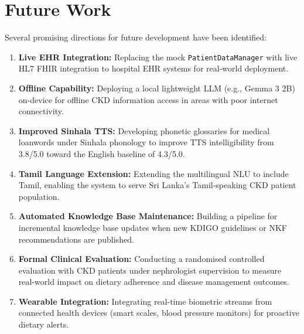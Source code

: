 \documentclass[12pt,a4paper]{report}
\begin{document}
\section{Future Work}

Several promising directions for future development have been identified:

\begin{enumerate}
  \item \textbf{Live EHR Integration:} Replacing the mock \texttt{PatientDataManager} with live HL7 FHIR integration to hospital EHR systems for real-world deployment.

  \item \textbf{Offline Capability:} Deploying a local lightweight LLM (e.g., Gemma 3 2B) on-device for offline CKD information access in areas with poor internet connectivity.

  \item \textbf{Improved Sinhala TTS:} Developing phonetic glossaries for medical loanwords under Sinhala phonology to improve TTS intelligibility from 3.8/5.0 toward the English baseline of 4.3/5.0.

  \item \textbf{Tamil Language Extension:} Extending the multilingual NLU to include Tamil, enabling the system to serve Sri Lanka's Tamil-speaking CKD patient population.

  \item \textbf{Automated Knowledge Base Maintenance:} Building a pipeline for incremental knowledge base updates when new KDIGO guidelines or NKF recommendations are published.

  \item \textbf{Formal Clinical Evaluation:} Conducting a randomised controlled evaluation with CKD patients under nephrologist supervision to measure real-world impact on dietary adherence and disease management outcomes.

  \item \textbf{Wearable Integration:} Integrating real-time biometric streams from connected health devices (smart scales, blood pressure monitors) for proactive dietary alerts.
\end{enumerate}
\end{document}
